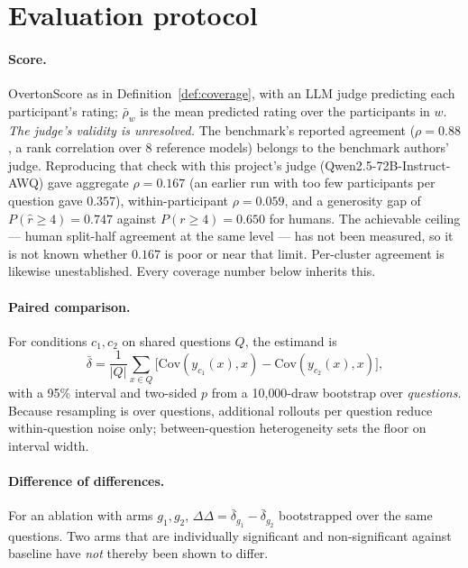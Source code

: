 \documentclass[11pt]{article}
\newcommand{\cov}{\mathrm{Cov}}
\begin{document}
\section{Evaluation protocol}

\paragraph{Score.} OvertonScore as in Definition~\ref{def:coverage}, with an LLM
judge predicting each participant's rating; $\bar\rho_w$ is the mean predicted
rating over the participants in $w$. \emph{The judge's validity is unresolved.}
The benchmark's reported agreement ($\rho = 0.88$, a rank correlation over 8
reference models) belongs to the benchmark authors' judge. Reproducing that
check with this project's judge (Qwen2.5-72B-Instruct-AWQ) gave aggregate
$\rho = 0.167$ (an earlier run with too few participants per question gave
$0.357$), within-participant $\rho = 0.059$, and a generosity gap of
$P(\hat r \ge 4) = 0.747$ against $P(r \ge 4) = 0.650$ for humans. The
achievable ceiling --- human split-half agreement at the same level --- has not
been measured, so it is not known whether $0.167$ is poor or near that limit.
Per-cluster agreement is likewise unestablished. Every coverage number below
inherits this.

\paragraph{Paired comparison.} For conditions $c_1, c_2$ on shared questions
$Q$, the estimand is
\[
  \bar\delta = \frac{1}{|Q|}\sum_{x \in Q}
  \big[\cov(y_{c_1}(x), x) - \cov(y_{c_2}(x), x)\big],
\]
with a 95\% interval and two-sided $p$ from a 10{,}000-draw bootstrap over
\emph{questions}. Because resampling is
over questions, additional rollouts per question reduce within-question noise
only; between-question heterogeneity sets the floor on interval width.

\paragraph{Difference of differences.} For an ablation with arms $g_1, g_2$,
$\Delta\Delta = \bar\delta_{g_1} - \bar\delta_{g_2}$ bootstrapped over the same
questions. Two arms that are individually significant and non-significant
against baseline have \emph{not} thereby been shown to differ.
\end{document}
